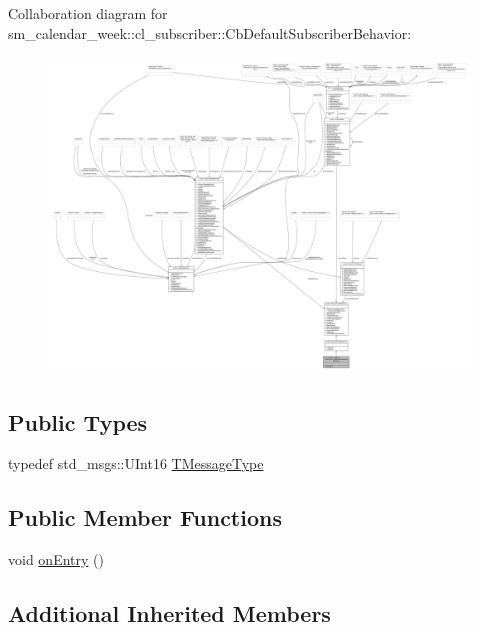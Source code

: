 Collaboration diagram for sm\+\_\+calendar\+\_\+week\+:\+:cl\+\_\+subscriber\+:\+:Cb\+Default\+Subscriber\+Behavior\+:
\nopagebreak
\begin{figure}[H]
\begin{center}
\leavevmode
\includegraphics[width=350pt]{classsm__calendar__week_1_1cl__subscriber_1_1CbDefaultSubscriberBehavior__coll__graph}
\end{center}
\end{figure}
\subsection*{Public Types}
\begin{DoxyCompactItemize}
\item 
typedef std\+\_\+msgs\+::\+U\+Int16 \hyperlink{classsm__calendar__week_1_1cl__subscriber_1_1CbDefaultSubscriberBehavior_ae1be7627d27b2fdabdb25190fdc94a0e}{T\+Message\+Type}
\end{DoxyCompactItemize}
\subsection*{Public Member Functions}
\begin{DoxyCompactItemize}
\item 
void \hyperlink{classsm__calendar__week_1_1cl__subscriber_1_1CbDefaultSubscriberBehavior_ab92e1f50bb88e3b47c2ee4520fecb719}{on\+Entry} ()
\end{DoxyCompactItemize}
\subsection*{Additional Inherited Members}


